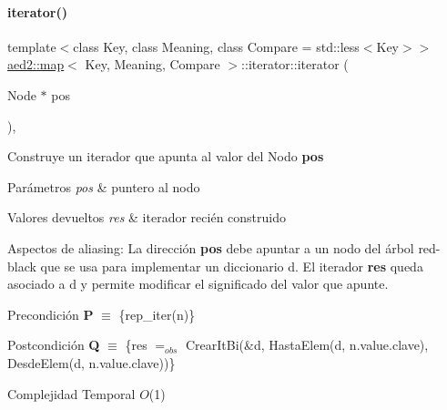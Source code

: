 \paragraph{\texorpdfstring{iterator()}{iterator()}\hspace{0.1cm}{\footnotesize\ttfamily [2/2]}}
{\footnotesize\ttfamily template$<$class Key, class Meaning, class Compare = std\+::less$<$\+Key$>$$>$ \\
\hyperlink{classaed2_1_1map}{aed2\+::map}$<$ Key, Meaning, Compare $>$\+::iterator\+::iterator (\begin{DoxyParamCaption}\item[{Node $\ast$}]{pos }\end{DoxyParamCaption})\hspace{0.3cm}{\ttfamily [inline]}, {\ttfamily [private]}}



Construye un iterador que apunta al valor del Nodo {\bfseries pos} 


\begin{DoxyParams}{Parámetros}
{\em pos} & puntero al nodo \\
\hline
\end{DoxyParams}

\begin{DoxyRetVals}{Valores devueltos}
{\em res} & iterador recién construido\\
\hline
\end{DoxyRetVals}
\begin{DoxyParagraph}{Aspectos de aliasing\+:}
La dirección {\bfseries pos} debe apuntar a un nodo del árbol red-\/black que se usa para implementar un diccionario {\ttfamily d}. El iterador {\bfseries res} queda asociado a {\ttfamily d} y permite modificar el significado del valor que apunte.
\end{DoxyParagraph}
\begin{DoxyPrecond}{Precondición}
{\bfseries P} $\equiv$ \{rep\+\_\+iter(n)\} 
\end{DoxyPrecond}
\begin{DoxyPostcond}{Postcondición}
{\bfseries Q} $\equiv$ \{res $=_{obs}$ Crear\+It\+Bi(\&{\ttfamily d}, Hasta\+Elem(d, n.\+value.\+clave), Desde\+Elem(d, n.\+value.\+clave))\}
\end{DoxyPostcond}

\begin{DoxyDescription}
\item[Complejidad Temporal]$O$(1)
\end{DoxyDescription}

